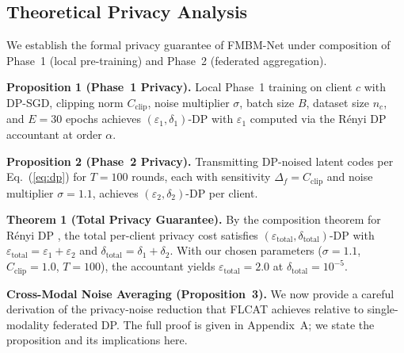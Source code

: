 \documentclass[a4paper,fleqn]{cas-dc}
\begin{document}
\subsection{Theoretical Privacy Analysis}
\label{subsec:privacy_theory}

We establish the formal privacy guarantee of FMBM-Net under composition of
Phase~1 (local pre-training) and Phase~2 (federated aggregation).

\textbf{Proposition 1 (Phase~1 Privacy).}
Local Phase~1 training on client $c$ with DP-SGD, clipping norm $C_{\mathrm{clip}}$,
noise multiplier $\sigma$, batch size $B$, dataset size $n_c$, and
$E\!=\!30$ epochs achieves $(\varepsilon_1, \delta_1)$-DP with
$\varepsilon_1$ computed via the R\'{e}nyi DP accountant
\citep{mironov2017renyi} at order $\alpha$.

\textbf{Proposition 2 (Phase~2 Privacy).}
Transmitting DP-noised latent codes per Eq.~(\ref{eq:dp}) for $T\!=\!100$
rounds, each with sensitivity $\Delta_f\!=\!C_{\mathrm{clip}}$ and noise
multiplier $\sigma\!=\!1.1$, achieves $(\varepsilon_2,\delta_2)$-DP
per client.

\textbf{Theorem 1 (Total Privacy Guarantee).}
By the composition theorem for R\'{e}nyi DP \citep{mironov2017renyi},
the total per-client privacy cost satisfies
$(\varepsilon_{\mathrm{total}}, \delta_{\mathrm{total}})$-DP with
$\varepsilon_{\mathrm{total}}\!=\!\varepsilon_1 + \varepsilon_2$ and
$\delta_{\mathrm{total}}\!=\!\delta_1 + \delta_2$. With our chosen parameters
($\sigma\!=\!1.1$, $C_{\mathrm{clip}}\!=\!1.0$, $T\!=\!100$), the accountant
yields $\varepsilon_{\mathrm{total}}\!=\!2.0$ at $\delta_{\mathrm{total}}\!=\!10^{-5}$.

\textbf{Cross-Modal Noise Averaging (Proposition~3).}
We now provide a careful derivation of the privacy-noise reduction that
FLCAT achieves relative to single-modality federated DP. The full proof is
given in Appendix~A; we state the proposition and its implications here.
\end{document}
